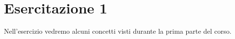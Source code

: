 \chapter{Esercitazione 1}
Nell'esercizio vedremo alcuni concetti visti durante la prima parte del corso. 